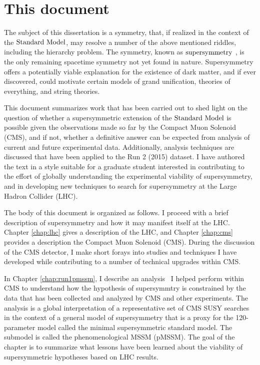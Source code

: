\section{This document}

The subject of this dissertation is a symmetry, that, if realized in the context of the $\text{Standard\ Model}$, may resolve a number of the above mentioned riddles, including the hierarchy problem. The symmetry, known as $\text{supersymmetry}$ \cite{Martin:1997ns}, is the only remaining spacetime symmetry not yet found in nature. Supersymmetry offers a potentially viable explanation for the existence of dark matter, and if ever discovered, could motivate certain models of grand unification, theories of everything, and string theories. 

This document summarizes work that has been carried out to shed light on the question of whether a supersymmetric extension of the $\text{Standard\ Model}$ is possible given the observations made so far by the Compact Muon Solenoid (CMS), and if not, whether a definitive answer can be expected from analysis of current and future experimental data. Additionally, analysis techniques are discussed that have been applied to the Run 2 (2015) dataset. I have authored the text in a style suitable for a graduate student interested in contributing to the effort of globally understanding the experimental viability of supersymmetry, and in developing new techniques to search for  supersymmetry at the Large Hadron Collider (LHC).

The body of this document is organized as follows. I proceed with a brief description of supersymmetry and how it may manifest itself at the LHC.  Chapter \ref{chap:lhc} gives a description of the LHC, and Chapter \ref{chap:cms} provides a description the Compact Muon Solenoid (CMS). During the discussion of the CMS detector, I make short forays into studies and techniques I have developed while contributing to a number of technical upgrades within CMS. 

In Chapter \ref{chap:run1pmssm}, I describe an analysis~\cite{Khachatryan:2016nvf} I helped perform within CMS to understand how the hypothesis of supersymmtry is constrained by the data that has been collected and analyzed by CMS and other experiments. The analysis is a global interpretation of a representative set of CMS SUSY searches in the context of a general model of supersymmetry that is a proxy for the 120-parameter model called the minimal supersymmetric standard model. The submodel is called the phenomenological MSSM (pMSSM). The goal of the chapter is to summarize what lessons have been learned about the viability of supersymmetric hypotheses based on LHC results. 

